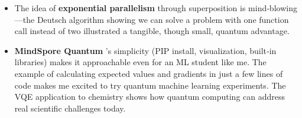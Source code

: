 \begin{itemize}
\tightlist
\item
  The idea of \textbf{exponential parallelism} through superposition is
  mind‑blowing---the Deutsch algorithm showing we can solve a problem
  with one function call instead of two illustrated a tangible, though
  small, quantum advantage.
\item
  \textbf{MindSpore Quantum} 's simplicity (PIP install, visualization,
  built‑in libraries) makes it approachable even for an ML student like
  me. The example of calculating expected values and gradients in just a
  few lines of code makes me excited to try quantum machine learning
  experiments. The VQE application to chemistry shows how quantum
  computing can address real scientific challenges today.
\end{itemize}
